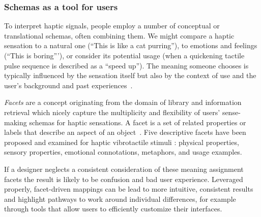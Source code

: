 \subsubsection{Schemas as a tool for users}
To interpret haptic signals, people employ a number of conceptual or translational  schemas, often combining them.  %
We might compare a haptic sensation to a natural one (``This is like a cat purring''), 
 to emotions and feelings (``This is boring'''), or
consider its potential usage (when a quickening tactile pulse sequence is described as a ``speed up''). 
%
The meaning someone chooses is typically influenced by the sensation itself but also by the context of use and the user's background and past experiences~\cite{seifi2015vibviz, schneider2014improvising, Obrist2013}. 

    
\textit{Facets} are a concept originating from the domain of library and information retrieval which nicely capture the multiplicity and flexibility of users' sense-making schemas for haptic sensations. A facet is a set of related properties or labels that describe an aspect of an object~\cite{facetedbrowsing2010}. Five descriptive facets have been proposed and examined for haptic vibrotactile stimuli \cite{seifi2015vibviz}: physical properties, sensory properties, emotional connotations, metaphors, and usage examples.
 
%    
%    
%        
%    

If a designer neglects a consistent consideration of these meaning assignment facets %
the result is likely to be confusion and bad user experience.
Leveraged properly, facet-driven 
mappings can be lead to more intuitive, consistent results and highlight pathways to work around individual differences, for example through tools that allow users to efficiently customize their interfaces.

